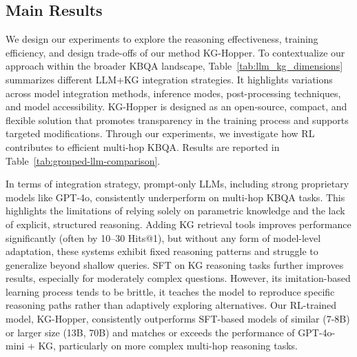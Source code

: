 \documentclass[10pt,conference]{IEEEtran}
\begin{document}
\subsection{Main Results}
\label{sec:main-results}
We design our experiments to explore the reasoning effectiveness, training efficiency, and design trade-offs of our method KG-Hopper. 
To contextualize our approach within the broader KBQA landscape, Table~\ref{tab:llm_kg_dimensions} summarizes different LLM+KG integration strategies. It highlights variations across model integration methods, inference modes, post-processing techniques, and model accessibility. 
KG-Hopper is designed as an open-source, compact, and flexible solution that promotes transparency in the training process and supports targeted modifications. Through our experiments, we investigate how RL contributes to efficient multi-hop KBQA. Results are reported in Table~\ref{tab:grouped-llm-comparison}.


In terms of integration strategy, prompt-only LLMs, including strong proprietary models like GPT-4o, consistently underperform on multi-hop KBQA tasks. This highlights the limitations of relying solely on parametric knowledge and the lack of explicit, structured reasoning. Adding KG retrieval tools improves performance significantly (often by 10–30 Hits@1), but without any form of model-level adaptation, these systems exhibit fixed reasoning patterns and struggle to generalize beyond shallow queries. SFT on KG reasoning tasks further improves results, especially for moderately complex questions. However,  its imitation-based learning process tends to be brittle, it teaches the model to reproduce specific reasoning paths rather than adaptively exploring alternatives. Our RL-trained model, {KG-Hopper}, consistently outperforms SFT-based models of similar (7-8B) or larger size (13B, 70B) and matches or exceeds the performance of GPT-4o-mini + KG, particularly on more complex multi-hop reasoning tasks. 
\end{document}

